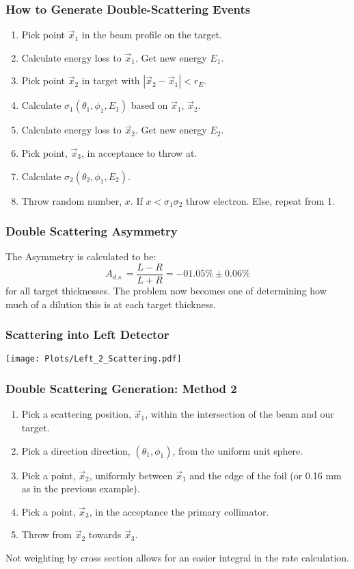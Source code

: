\documentclass{beamer}
\begin{document}
\begin{frame}
 \frametitle{How to Generate Double-Scattering Events}
  \begin{enumerate}
   \item Pick point $\vec{x}_1$ in the beam profile on the target.
   \item Calculate energy loss to $\vec{x}_1$. Get new energy $E_1$.
   \item Pick point $\vec{x}_2$ in target with $|\vec{x}_2 - \vec{x}_1| < r_E.$
   \item Calculate $\sigma_1(\theta_1,\phi_1, E_1)$ based on $\vec{x}_1$, $\vec{x}_2$.
   \item Calculate energy loss to $\vec{x}_2$. Get new energy $E_2$.
   \item Pick point, $\vec{x}_3$, in acceptance to throw at.
   \item Calculate $\sigma_2(\theta_2,\phi_1, E_2)$.
    \item Throw random number, $x$. If $ x < \sigma_1\sigma_2 $ throw electron. Else, repeat from 1.
  \end{enumerate}
\end{frame}
 
\begin{frame}
 \frametitle{Double Scattering Asymmetry}
  The Asymmetry is calculated to be:
  \begin{equation*}
   A_{d.s.} = \frac{L-R}{L+R} = -01.05\% \pm 0.06\%
  \end{equation*}
  for all target thicknesses. The problem now becomes one of determining how much of a dilution this is at each target thickness.
\end{frame}
 
\begin{frame}
 \frametitle{Scattering into Left Detector}
  \centering
   \texttt{[image: Plots/Left\_2\_Scattering.pdf]}
\end{frame}

\begin{frame}
 \frametitle{Double Scattering Generation: Method 2}
 \begin{enumerate}
  \item Pick a scattering position, $\vec{x}_1$, within the intersection of the beam and our target.
  \item Pick a direction direction, $(\theta_1,\phi_1)$, from the uniform unit sphere.
  \item Pick a point, $\vec{x}_2$, uniformly between $\vec{x}_1$ and the edge of the foil (or 0.16 mm as in the previous example).
  \item Pick a point, $\vec{x}_3$, in the acceptance the primary collimator.
  \item Throw from $\vec{x}_2$ towards $\vec{x}_3$.
\end{enumerate}
Not weighting by cross section allows for an easier integral in the rate calculation. 
\end{frame}
\end{document}
